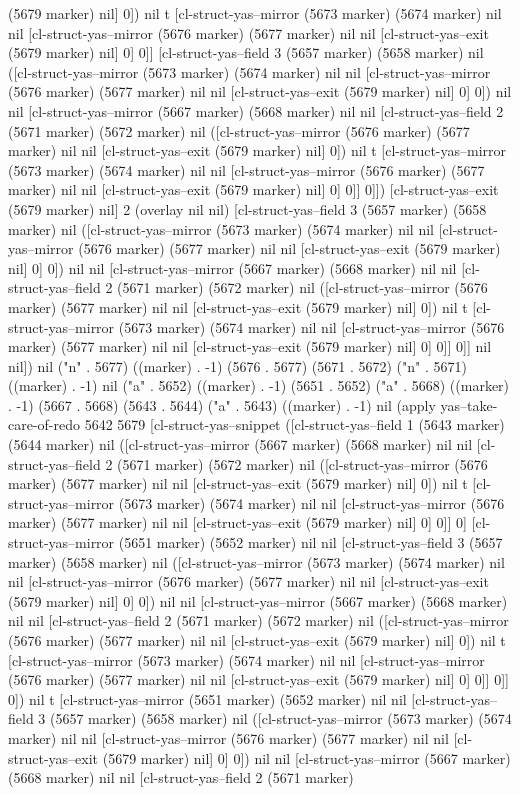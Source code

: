 (5679 marker) nil] 0]) nil t [cl-struct-yas--mirror (5673 marker) (5674 marker) nil nil [cl-struct-yas--mirror (5676 marker) (5677 marker) nil nil [cl-struct-yas--exit (5679 marker) nil] 0] 0]] [cl-struct-yas--field 3 (5657 marker) (5658 marker) nil ([cl-struct-yas--mirror (5673 marker) (5674 marker) nil nil [cl-struct-yas--mirror (5676 marker) (5677 marker) nil nil [cl-struct-yas--exit (5679 marker) nil] 0] 0]) nil nil [cl-struct-yas--mirror (5667 marker) (5668 marker) nil nil [cl-struct-yas--field 2 (5671 marker) (5672 marker) nil ([cl-struct-yas--mirror (5676 marker) (5677 marker) nil nil [cl-struct-yas--exit (5679 marker) nil] 0]) nil t [cl-struct-yas--mirror (5673 marker) (5674 marker) nil nil [cl-struct-yas--mirror (5676 marker) (5677 marker) nil nil [cl-struct-yas--exit (5679 marker) nil] 0] 0]] 0]]) [cl-struct-yas--exit (5679 marker) nil] 2 (overlay nil nil) [cl-struct-yas--field 3 (5657 marker) (5658 marker) nil ([cl-struct-yas--mirror (5673 marker) (5674 marker) nil nil [cl-struct-yas--mirror (5676 marker) (5677 marker) nil nil [cl-struct-yas--exit (5679 marker) nil] 0] 0]) nil nil [cl-struct-yas--mirror (5667 marker) (5668 marker) nil nil [cl-struct-yas--field 2 (5671 marker) (5672 marker) nil ([cl-struct-yas--mirror (5676 marker) (5677 marker) nil nil [cl-struct-yas--exit (5679 marker) nil] 0]) nil t [cl-struct-yas--mirror (5673 marker) (5674 marker) nil nil [cl-struct-yas--mirror (5676 marker) (5677 marker) nil nil [cl-struct-yas--exit (5679 marker) nil] 0] 0]] 0]] nil nil]) nil ("n" . 5677) ((marker) . -1) (5676 . 5677) (5671 . 5672) ("n" . 5671) ((marker) . -1) nil ("a" . 5652) ((marker) . -1) (5651 . 5652) ("a" . 5668) ((marker) . -1) (5667 . 5668) (5643 . 5644) ("a" . 5643) ((marker) . -1) nil (apply yas--take-care-of-redo 5642 5679 [cl-struct-yas--snippet ([cl-struct-yas--field 1 (5643 marker) (5644 marker) nil ([cl-struct-yas--mirror (5667 marker) (5668 marker) nil nil [cl-struct-yas--field 2 (5671 marker) (5672 marker) nil ([cl-struct-yas--mirror (5676 marker) (5677 marker) nil nil [cl-struct-yas--exit (5679 marker) nil] 0]) nil t [cl-struct-yas--mirror (5673 marker) (5674 marker) nil nil [cl-struct-yas--mirror (5676 marker) (5677 marker) nil nil [cl-struct-yas--exit (5679 marker) nil] 0] 0]] 0] [cl-struct-yas--mirror (5651 marker) (5652 marker) nil nil [cl-struct-yas--field 3 (5657 marker) (5658 marker) nil ([cl-struct-yas--mirror (5673 marker) (5674 marker) nil nil [cl-struct-yas--mirror (5676 marker) (5677 marker) nil nil [cl-struct-yas--exit (5679 marker) nil] 0] 0]) nil nil [cl-struct-yas--mirror (5667 marker) (5668 marker) nil nil [cl-struct-yas--field 2 (5671 marker) (5672 marker) nil ([cl-struct-yas--mirror (5676 marker) (5677 marker) nil nil [cl-struct-yas--exit (5679 marker) nil] 0]) nil t [cl-struct-yas--mirror (5673 marker) (5674 marker) nil nil [cl-struct-yas--mirror (5676 marker) (5677 marker) nil nil [cl-struct-yas--exit (5679 marker) nil] 0] 0]] 0]] 0]) nil t [cl-struct-yas--mirror (5651 marker) (5652 marker) nil nil [cl-struct-yas--field 3 (5657 marker) (5658 marker) nil ([cl-struct-yas--mirror (5673 marker) (5674 marker) nil nil [cl-struct-yas--mirror (5676 marker) (5677 marker) nil nil [cl-struct-yas--exit (5679 marker) nil] 0] 0]) nil nil [cl-struct-yas--mirror (5667 marker) (5668 marker) nil nil [cl-struct-yas--field 2 (5671 marker) 